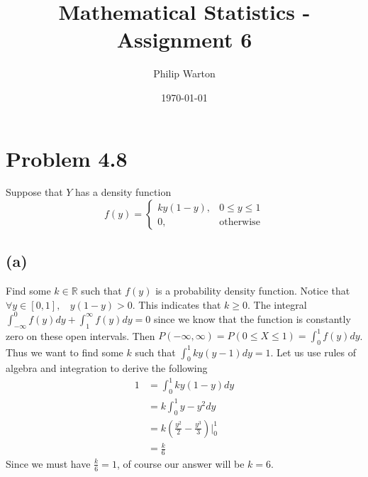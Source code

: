 \documentclass{article}
\theoremstyle{definition}
\begin{document}
\title{Mathematical Statistics - Assignment 6}
\author{Philip Warton}
\date{\today}
\maketitle
\section*{Problem 4.8}
    Suppose that $Y$ has a density function
    \[
        f(y) = 
        \begin{cases}
            k y (1-y), & 0 \leq y \leq 1\\
            0, & \text{otherwise}
        \end{cases}
    \]
    \subsection*{(a)} 
        Find some $k \in \mathbb{R}$ such that $f(y)$ is a probability
        density function. Notice that $\forall y \in [0,1],\ \ \ \ y(1-y) > 0$. This indicates
        that $k \geq 0$. The integral $\int_{-\infty}^0 f(y)dy + \int_1^\infty f(y)dy = 0$ since we know that
        the function is constantly zero on these open intervals. Then $P(-\infty, \infty) = P(0 \leq X \leq 1) = \int_0^1 f(y) dy$.
        Thus we want to find some $k$ such that $\int_0^1 k y (y-1) dy = 1$. Let us use rules of algebra and
        integration to derive the following
        \begin{align*}
            1 & = \int_0^1 ky(1-y)dy\\
            &= k \int_0^1 y-y^2 dy\\
            &= k \left(\frac{y^2}{2} - \frac{y^3}{3}\right)\bigg|_0^1\\
            &= \frac{k}{6}
        \end{align*}
        Since we must have $\frac{k}{6} = 1$, of course our answer will be $k = 6$.
\end{document}
